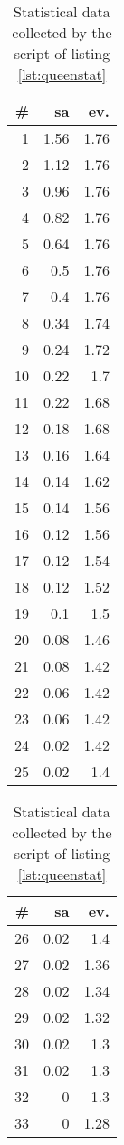 \begin{appendices}
\begin{table}[h]
\caption{Statistical data collected by the script of listing \ref{lst:queenstat}}
\begin{minipage}[t]{0.24\linewidth}
\begin{tabular}{|r|r|r|}
\hline
\# & sa & ev.\\
\hline
\hline
1 & 1.56 & 1.76\\
2 & 1.12 & 1.76\\
3 & 0.96 & 1.76\\
4 & 0.82 & 1.76\\
5 & 0.64 & 1.76\\
6 & 0.5 & 1.76\\
7 & 0.4 & 1.76\\
8 & 0.34 & 1.74\\
9 & 0.24 & 1.72\\
10 & 0.22 & 1.7\\
11 & 0.22 & 1.68\\
12 & 0.18 & 1.68\\
13 & 0.16 & 1.64\\
14 & 0.14 & 1.62\\
15 & 0.14 & 1.56\\
16 & 0.12 & 1.56\\
17 & 0.12 & 1.54\\
18 & 0.12 & 1.52\\
19 & 0.1 & 1.5\\
20 & 0.08 & 1.46\\
21 & 0.08 & 1.42\\
22 & 0.06 & 1.42\\
23 & 0.06 & 1.42\\
24 & 0.02 & 1.42\\
25 & 0.02 & 1.4\\
\hline
\end{tabular}
\end{minipage}
\begin{minipage}[t]{0.24\linewidth}
\begin{tabular}{|r|r|r|}
\hline
\# & sa & ev.\\
\hline
\hline
26 & 0.02 & 1.4\\
27 & 0.02 & 1.36\\
28 & 0.02 & 1.34\\
29 & 0.02 & 1.32\\
30 & 0.02 & 1.3\\
31 & 0.02 & 1.3\\
32 & 0 & 1.3\\
33 & 0 & 1.28\\

\end{tabular}
\end{minipage}
\end{table}
\end{appendices}
